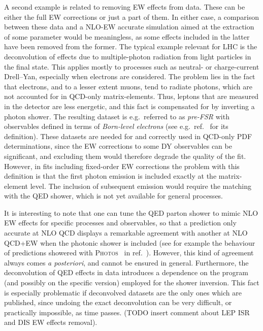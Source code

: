 
A second example is related to removing EW effects from data. These can be either the full EW corrections
or just a part of them. In either case, a comparison between these data and a NLO-EW accurate simulation aimed at the extraction of some parameter would be meaningless, as some effects included in the latter
have been removed from the former. The typical example relevant for LHC is the deconvolution of effects due to multiple-photon radiation
from light particles in the final state. This applies mostly
to processes such as neutral- or charge-current Drell--Yan, especially when electrons are considered. The problem lies in the fact that
 electrons, and to a lesser extent muons, tend to radiate photons, which are not accounted
for in QCD-only matrix-elements. Thus, leptons that are measured in the detector are less energetic, and this fact is compensated for
by inverting a photon shower. The resulting dataset is e.g.\ referred to as \emph{pre-FSR} with observables defined in terms of \emph{Born-level electrons} (see e.g.\ ref.~\cite{Aad:2015auj} for its definition).
These datasets are needed for and correctly used in QCD-only PDF determinations, since the EW corrections to some DY observables can be significant, and excluding them would therefore degrade the quality of the fit.
However, in fits including fixed-order EW corrections the problem with this definition is that the first photon emission is included exactly at the matrix-element level. The inclusion of
subsequent emission would require the matching with the QED shower, which is not yet available for general processes.

It is interesting
to note that one can tune the QED parton shower to mimic NLO EW effects for specific processes and observables, so that a prediction only accurate at NLO
QCD displays a remarkable agreement with another at NLO QCD+EW when the photonic shower is included (see for example the behaviour of predictions showered with
\textsc{Photos}~\cite{Barberio:1990ms,Barberio:1993qi,Golonka:2005pn} in ref.~\cite{CarloniCalame:2016ouw}). However, this kind of agreement
always comes \emph{a posteriori}, and cannot be ensured in general.
Furthermore, the deconvolution of QED effects in data introduces a dependence on the program (and possibly on 
the specific version) employed for the shower inversion. 
This fact is especially problematic if deconvolved datasets are the only ones which are published, since undoing the exact deconvolution can be very difficult, or practically impossible, as time passes. (TODO insert comment about LEP ISR and DIS EW effects removal).

